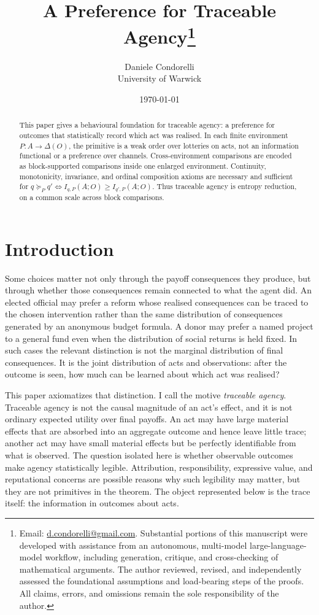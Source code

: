 \documentclass[11pt,a4paper]{article}
\title{A Preference for Traceable Agency\thanks{Email: \href{mailto:d.condorelli@gmail.com}{d.condorelli@gmail.com}. Substantial portions of this manuscript were developed with assistance from an autonomous, multi-model large-language-model workflow, including generation, critique, and cross-checking of mathematical arguments. The author reviewed, revised, and independently assessed the foundational assumptions and load-bearing steps of the proofs. All claims, errors, and omissions remain the sole responsibility of the author.}}
\author{Daniele Condorelli\\University of Warwick}
\date{\today}
\theoremstyle{definition}
\newcommand{\1}{\mathbf 1}
\begin{document}
\maketitle

\begin{abstract}
This paper gives a behavioural foundation for traceable agency: a preference for outcomes that statistically record which
act was realised.  In each finite environment $P:A\to\Delta(O)$, the primitive is a weak order over lotteries on acts, not
an information functional or a preference over channels.  Cross-environment comparisons are encoded as block-supported
comparisons inside one enlarged environment.  Continuity, monotonicity, invariance, and ordinal composition axioms are
necessary and sufficient for $q\succeq_P q'\Longleftrightarrow I_{q,P}(A;O)\ge I_{q',P}(A;O)$.  Thus traceable agency is
entropy reduction, on a common scale across block comparisons.
\end{abstract}

\section*{Introduction}

Some choices matter not only through the payoff consequences they produce, but through whether those consequences remain
connected to what the agent did.  An elected official may prefer a reform whose realised consequences can be traced to the
chosen intervention rather than the same distribution of consequences generated by an anonymous budget formula.  A donor
may prefer a named project to a general fund even when the distribution of social returns is held fixed.  In such cases
the relevant distinction is not the marginal distribution of final consequences.  It is the joint distribution of acts and
observations: after the outcome is seen, how much can be learned about which act was realised?

This paper axiomatizes that distinction.  I call the motive \emph{traceable agency}.  Traceable agency is not the causal
magnitude of an act's effect, and it is not ordinary expected utility over final payoffs.  An act may have large material
effects that are absorbed into an aggregate outcome and hence leave little trace; another act may have small material
effects but be perfectly identifiable from what is observed.  The question isolated here is whether observable outcomes
make agency statistically legible.  Attribution, responsibility, expressive value, and reputational concerns are possible
reasons why such legibility may matter, but they are not primitives in the theorem.  The object represented below is the
trace itself: the information in outcomes about acts.
\end{document}
